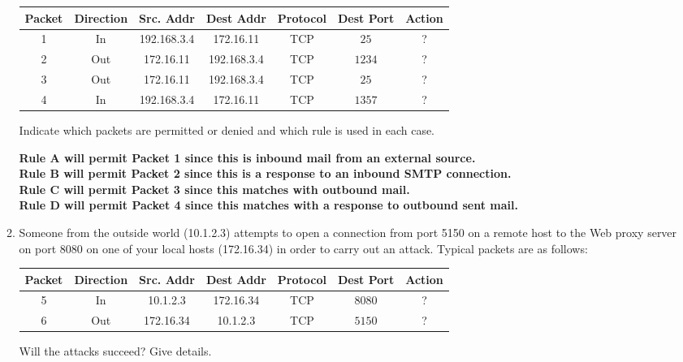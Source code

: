 \documentclass[12pt]{article}
\begin{document}
\begin{enumerate}
\begin{enumerate}
  \begin{center}
   \begin{tabular}{||c c c c c c c||}
   \hline
   Packet & Direction & Src. Addr & Dest Addr  & Protocol & Dest Port & Action \\ [0.5ex]
   \hline\hline
   1 & In & 192.168.3.4 & 172.16.11 & TCP & $25$ & ? \\
   \hline
   2 & Out & 172.16.11 & 192.168.3.4 & TCP & $1234$ & ? \\
   \hline
   3 & Out & 172.16.11 & 192.168.3.4 & TCP & $25$ & ? \\
   \hline
   4 & In & 192.168.3.4 & 172.16.11 & TCP & $1357$ & ? \\ [1ex]
   \hline
  \end{tabular}
  \end{center}

  Indicate which packets are permitted or denied and which rule is used in each case.

  \textbf{Rule A will permit Packet 1 since this is inbound mail from an external source.} \\
  \textbf{Rule B will permit Packet 2 since this is a response to an inbound SMTP connection.} \\
  \textbf{Rule C will permit Packet 3 since this matches with outbound mail.} \\
  \textbf{Rule D will permit Packet 4 since this matches with a response to outbound sent mail.} \\

  \item Someone from the outside world (10.1.2.3) attempts to open a connection from port 5150 on a remote host to the Web proxy server on port 8080 on one of your local hosts (172.16.34) in order to carry out an attack. Typical packets are as follows:

  \begin{center}
   \begin{tabular}{||c c c c c c c||}
   \hline
   Packet & Direction & Src. Addr & Dest Addr  & Protocol & Dest Port & Action \\ [0.5ex]
   \hline\hline
   5 & In & 10.1.2.3 & 172.16.34 & TCP & $8080$ & ? \\
   \hline
   6 & Out & 172.16.34 & 10.1.2.3 & TCP & $5150$ & ? \\ [1ex]
   \hline
  \end{tabular}
  \end{center}

  Will the attacks succeed? Give details.


\end{enumerate}
\end{enumerate}
\end{document}

